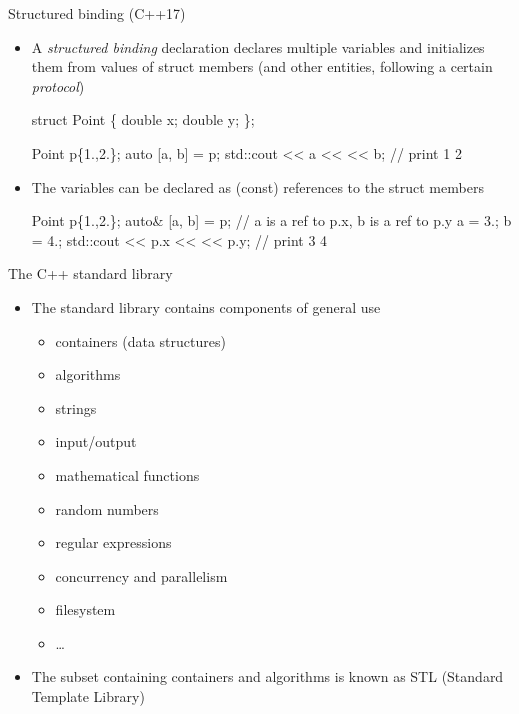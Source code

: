 \begin{frame}[fragile]{Structured binding (C++17)}
  \begin{itemize}
  \item A \textit{structured binding} declaration declares multiple variables
    and initializes them from values of struct members (and other entities,
    following a certain \textit{protocol})
    \begin{codeblock}
struct Point \{
  double x;
  double y;
\};

Point p\{1.,2.\};
auto [a, b] = p;
std::cout << a << \upquote{ } << b; // print 1 2\end{codeblock}

  \item<2-> The variables can be declared as (const) references to the struct members
    \begin{codeblock}
Point p\{1.,2.\};
auto& [a, b] = p; // a is a ref to p.x, b is a ref to p.y
a = 3.;
b = 4.;
std::cout << p.x << \upquote{ } << p.y; // print 3 4\end{codeblock}

  \end{itemize}
\end{frame}

\begin{frame}{The C++ standard library}

  \begin{itemize}
  \item The standard library contains components of general use
    \begin{itemize}[<.->]
    \item \alert<2>{containers (data structures)}
    \item \alert<2>{algorithms}
    \item strings
    \item input/output
    \item mathematical functions
    \item random numbers
    \item regular expressions
    \item concurrency and parallelism
    \item filesystem
    \item \ldots
    \end{itemize}

  \item<2-> The subset containing containers and algorithms is known as STL
    (Standard Template Library)
  \end{itemize}

\end{frame}

